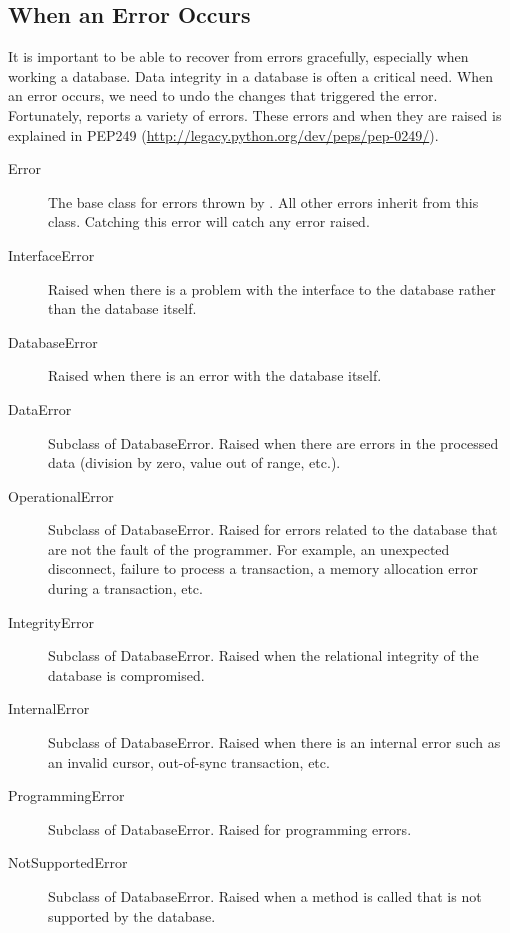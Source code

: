 \begin{comment}
From the ICD9 table you created in Problem \ref{prob:icd9tables}, how many men between the ages of 25 and 35 are there?  How many women between those same ages?

What code is the most frequent code for men between age 25 and 35?
What code is the most frequent for women between  the same age?
\end{comment}

\subsection*{When an Error Occurs}
It is important to be able to recover from errors gracefully, especially when working a database.
Data integrity in a database is often a critical need.
When an error occurs, we need to undo the changes that triggered the error.
Fortunately,  reports a variety of errors.
These errors and when they are raised is explained in PEP249 (\url{http://legacy.python.org/dev/peps/pep-0249/}).
\begin{description}
\item[Error] The base class for errors thrown by .  All other errors inherit from this class.  Catching this error will catch any error raised.
\item[InterfaceError] Raised when there is a problem with the interface to the database rather than the database itself.
\item[DatabaseError] Raised when there is an error with the database itself.
\item[DataError] Subclass of DatabaseError.  Raised when there are errors in the processed data (division by zero, value out of range, etc.).
\item[OperationalError] Subclass of DatabaseError. Raised for errors related to the database that are not the fault of the programmer.  For example, an unexpected disconnect, failure to process a transaction, a memory allocation error during a transaction, etc.
\item[IntegrityError] Subclass of DatabaseError.  Raised when the relational integrity of the database is compromised.
\item[InternalError] Subclass of DatabaseError. Raised when there is an internal error such as an invalid cursor, out-of-sync transaction, etc.
\item[ProgrammingError] Subclass of DatabaseError.  Raised for programming errors.
\item[NotSupportedError] Subclass of DatabaseError.  Raised when a method is called that is not supported by the database.
\end{description}

